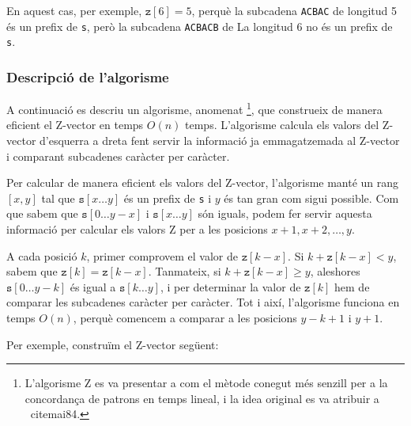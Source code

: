 En aquest cas, per exemple, $\texttt{z}[6]=5$, perquè la subcadena
\texttt{ACBAC} de longitud 5 és un prefix de \texttt{s}, però la
subcadena \texttt{ACBACB} de La longitud 6 no és un prefix de
\texttt{s}.

\subsubsection*{Descripció de l'algorisme}

A continuació es descriu un algorisme, anomenat \footnote{L'algorisme Z es va presentar a \cite{gus97} com el
mètode conegut més senzill per a la concordança de patrons en temps
lineal, i la idea original es va atribuir a \ cite{mai84}.}, que
construeix de manera eficient el Z-vector en temps $O(n)$
temps. L'algorisme calcula els valors del Z-vector d'esquerra a
dreta fent servir la informació ja emmagatzemada al Z-vector i
comparant subcadenes caràcter per caràcter.

Per calcular de manera eficient els valors del Z-vector, l'algorisme
manté un rang $[x,y]$ tal que $\texttt{s}[x \ldots y]$ és un prefix
de \texttt{s} i $y$ és tan gran com sigui possible. Com que sabem
que $\texttt{s}[0 \ldots y-x]$ i $\texttt{s}[x \ldots y]$ són iguals,
podem fer servir aquesta informació per calcular els valors Z per a les
posicions $x+1, x+2, \ldots, y$.

A cada posició $k$, primer comprovem el valor de $\texttt{z}[k-x]$. Si
$k+\texttt{z}[k-x]<y$, sabem que
$\texttt{z}[k]=\texttt{z}[k-x]$. Tanmateix, si
$k+\texttt{z}[k-x] \ge y$, aleshores $\texttt{s}[0 \ldots y-k]$ és igual a
$\texttt{s}[k \ldots y]$, i
per determinar la valor de $\texttt{z}[k]$ hem de comparar les
subcadenes caràcter per caràcter. Tot i així, l'algorisme funciona en
temps $O(n)$, perquè comencem a comparar a les posicions $y-k+1$ i
$y+1$.

Per exemple, construïm el Z-vector següent:


